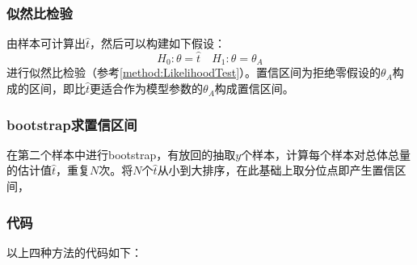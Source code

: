 \subsubsection{似然比检验}
由样本可计算出$\hat{t}$，然后可以构建如下假设：
\begin{equation*}
	H_0:\theta=\hat{t}\quad H_1:\theta=\theta_A
\end{equation*}
进行似然比检验（参考\cref{method:LikelihoodTest}）。置信区间为拒绝零假设的$\theta_A$构成的区间，即比$\hat{t}$更适合作为模型参数的$\theta_A$构成置信区间。
\subsubsection{bootstrap求置信区间}
在第二个样本中进行bootstrap，有放回的抽取$y$个样本，计算每个样本对总体总量的估计值$\hat{t}$，重复$N$次。将$N$个$\hat{t}$从小到大排序，在此基础上取分位点即产生置信区间，
\subsubsection{代码}
以上四种方法的代码如下：
\inputminted[bgcolor=white, linenos, frame=single, numbersep=5pt, breaklines]{r}{sampling-method/tag-recapture/tag-recapture.R}